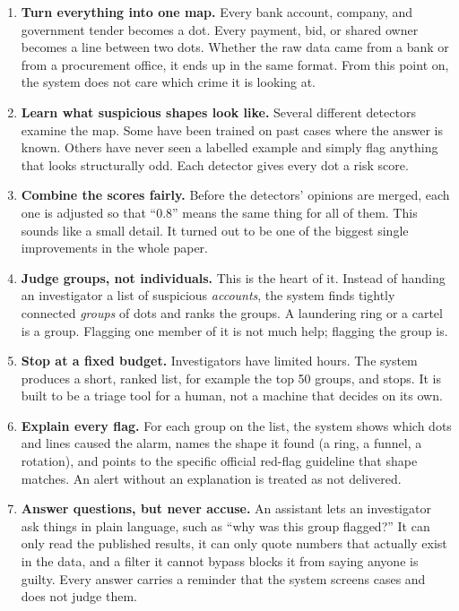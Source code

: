 \documentclass[11pt,a4paper]{article}
\begin{document}
\begin{enumerate}[label=\textbf{Step \arabic*.}, leftmargin=*, itemsep=6pt]

\item \textbf{Turn everything into one map.}
Every bank account, company, and government tender becomes a dot. Every
payment, bid, or shared owner becomes a line between two dots. Whether the raw
data came from a bank or from a procurement office, it ends up in the same
format. From this point on, the system does not care which crime it is looking
at.

\item \textbf{Learn what suspicious shapes look like.}
Several different detectors examine the map. Some have been trained on past
cases where the answer is known. Others have never seen a labelled example and
simply flag anything that looks structurally odd. Each detector gives every dot
a risk score.

\item \textbf{Combine the scores fairly.}
Before the detectors' opinions are merged, each one is adjusted so that ``0.8''
means the same thing for all of them. This sounds like a small detail. It
turned out to be one of the biggest single improvements in the whole paper.

\item \textbf{Judge groups, not individuals.}
This is the heart of it. Instead of handing an investigator a list of suspicious
\emph{accounts}, the system finds tightly connected \emph{groups} of dots and
ranks the groups. A laundering ring or a cartel is a group. Flagging one member
of it is not much help; flagging the group is.

\item \textbf{Stop at a fixed budget.}
Investigators have limited hours. The system produces a short, ranked list, for
example the top 50 groups, and stops. It is built to be a triage tool for a
human, not a machine that decides on its own.

\item \textbf{Explain every flag.}
For each group on the list, the system shows which dots and lines caused the
alarm, names the shape it found (a ring, a funnel, a rotation), and points to
the specific official red-flag guideline that shape matches. An alert without
an explanation is treated as not delivered.

\item \textbf{Answer questions, but never accuse.}
An assistant lets an investigator ask things in plain language, such as ``why
was this group flagged?'' It can only read the published results, it can only
quote numbers that actually exist in the data, and a filter it cannot bypass
blocks it from saying anyone is guilty. Every answer carries a reminder that
the system screens cases and does not judge them.
\end{enumerate}
\end{document}
